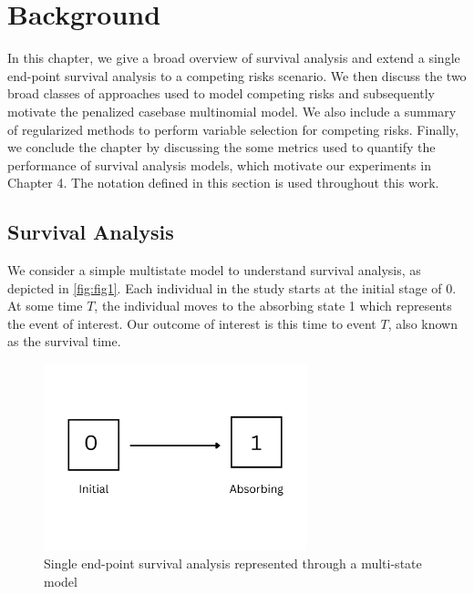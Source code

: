 \chapter{Background}
\label{ch:Background}

In this chapter, we give a broad overview of survival analysis and extend a single end-point survival analysis to a competing risks scenario. We then discuss the two broad classes of approaches used to model competing risks and subsequently motivate the penalized casebase multinomial model. We also include a summary of regularized methods to perform variable selection for competing risks. Finally, we conclude the chapter by discussing the some metrics used to quantify the performance of survival analysis models, which motivate our experiments in Chapter 4. The notation defined in this section is used throughout this work.


\section{Survival Analysis}

We consider a simple multistate model to understand survival analysis, as depicted in \autoref{fig:fig1}. Each individual in the study starts at the initial stage of 0. At some time $T$, the individual moves to the absorbing state 1 which represents the event of interest. Our outcome of interest is this time to event $T$, also known as the survival time. 


\begin{figure}[h]
    \centering
    \includegraphics[width=3in]{survival_mstate.png}
    \caption{Single end-point survival analysis represented through a multi-state model}
    \label{fig:fig1}   %
    \end{figure}

